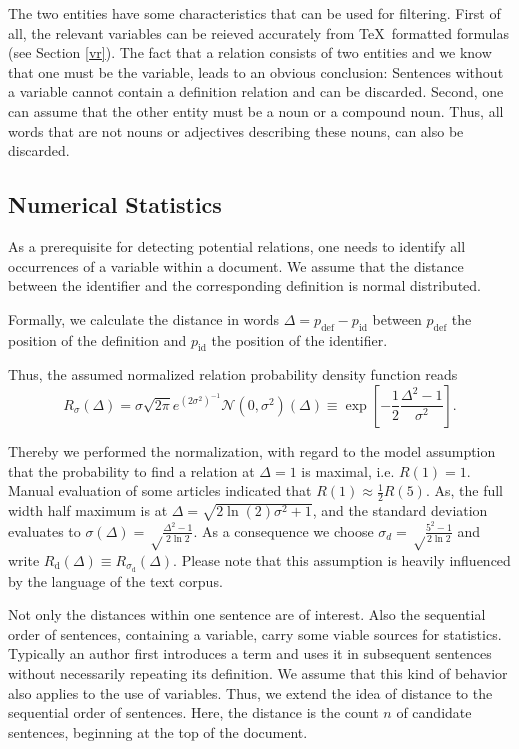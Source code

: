 \documentclass[runningheads]{llncs}
\begin{document}
The two entities have some characteristics that can be used for filtering.
First of all, the relevant variables can be reieved accurately from \TeX\
formatted formulas (see Section \ref{vr}). The fact that a relation consists
of two entities and we know that one must be the variable, leads to an obvious
conclusion: Sentences without a variable cannot contain a definition relation
and can be discarded. Second, one can assume that the other entity must be a
noun or a compound noun. Thus, all words that are not nouns or adjectives
describing these nouns, can also be discarded.


\subsection{Numerical Statistics}
As a prerequisite for detecting potential relations, one needs to identify all
occurrences of a variable within a document. We assume that the distance
between the identifier and the corresponding definition is normal distributed.

Formally, we calculate the distance in words
$\Delta=p_\mathrm{def}-p_\mathrm{id}$  between $p_\mathrm{def}$ the position
of the definition and $p_\mathrm{id}$ the position of the identifier.

Thus, the assumed normalized relation probability density function reads
\begin{equation}
\label{eq:dist}
R_\sigma(\Delta)= {\sigma \sqrt{2\pi}}{e^{{\left(2\sigma^2\right)^{-1}}}} \mathcal N(0,\sigma^2)(\Delta)\equiv \exp\left[-\frac{1}{2}\frac{\Delta^2-1}{\sigma^2}\right].
\end{equation}
\newcommand{\normalPlot}[2]{(e^((-1/2)*(((#1)^2-1)/(#2)^2)))} %
\newcommand{\normalPlotFWHM}[2]{\normalPlot{#1}{ sqrt(((#2)^2-1)/(2*ln(2)))}}

Thereby we performed the normalization, with regard to the model assumption
that the probability to find a relation at $\Delta=1$ is maximal, i.e.
$R(1)=1$.  Manual evaluation of some articles indicated that
$R(1)\approx\frac{1}{2}R(5)$. As, the full width half maximum is at
$\Delta=\sqrt{2 \ln(2)  \sigma^2+1}$, and the standard deviation evaluates to
$\sigma(\Delta)=\sqrt\frac{\Delta^2-1}{2\ln 2}$. As a consequence we choose
$\sigma_d=\sqrt\frac{5^2-1}{2\ln 2}$ and write $R_\mathrm{d}(\Delta) \equiv
R_{\sigma_\mathrm{d}}(\Delta) $. Please note that this assumption is heavily
influenced by the language of the text corpus.

Not only the distances within one sentence are of interest. Also the
sequential order of sentences, containing a variable, carry some viable
sources for statistics. Typically an author first introduces a term and uses
it in subsequent sentences without necessarily repeating its definition. We
assume that this kind of behavior also applies to the use of variables. Thus,
we extend the idea of distance to the sequential order of sentences. Here, the
distance is the count $n$ of candidate sentences, beginning at the top of the
document.
\end{document}
